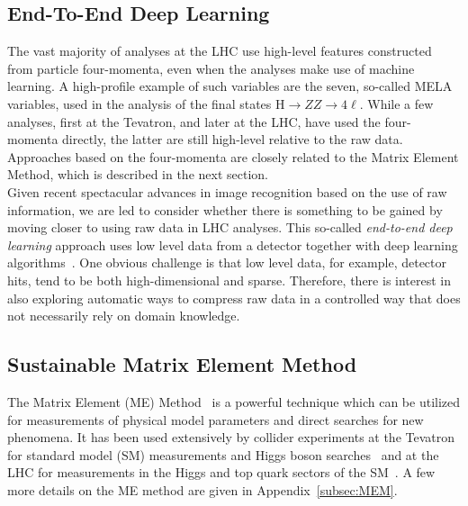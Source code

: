 \subsection{End-To-End Deep Learning}\label{subsec:endtoend}
\label{sec:applications-e2e}
The vast majority of analyses at the LHC use high-level features constructed from particle four-momenta, even when the analyses make use of machine learning. A high-profile example of such variables are the seven, so-called MELA variables, used in the analysis of the final states $\textrm{H} \rightarrow ZZ \rightarrow 4\ell$. While a few analyses, first at the Tevatron, and later at the LHC, have used the four-momenta directly, the latter are still high-level relative to the raw data. Approaches based on the four-momenta are closely related to the Matrix Element Method, which is described in the next section.\\

Given recent spectacular advances in image recognition based on the use of raw information, we are led to consider whether there is something to be gained by moving closer to using raw data in LHC analyses. This so-called \emph{end-to-end deep learning} approach uses low level data from a detector together with deep learning algorithms~\cite{Andrews:2018nwy,Andrews:2019faz}. One obvious challenge is that low level data, for example, detector hits, tend to be both high-dimensional and sparse.
Therefore, there is interest in also exploring automatic ways to compress raw data in a controlled way that does not necessarily rely on domain knowledge.


\subsection{Sustainable Matrix Element Method}
\label{sec:applications-MEM}


The Matrix Element (ME) Method~\cite{Kondo:1988yd,Fiedler:2010sg,2011arXiv1101.2259V,Elahi:2017ppe} is a powerful technique which can be utilized for measurements of physical model parameters and direct searches for new phenomena.
It has been used extensively by collider experiments at the Tevatron for standard model (SM) measurements and Higgs boson searches~\cite{Abazov:2004cs,Abulencia:2006ry,Aaltonen:2008mv,Aaltonen:2010cm,Abazov:2009ii,Aaltonen:2009jj} and at the LHC for measurements in the Higgs and top quark sectors of the SM~\cite{Chatrchyan:2012xdj,Chatrchyan:2013mxa,Aad:2014eva,Khachatryan:2015tzo, Khachatryan:2015ila,Aad:2015gra,Aad:2015upn}. A few more details on the ME method are given in Appendix~\ref{subsec:MEM}.\\

